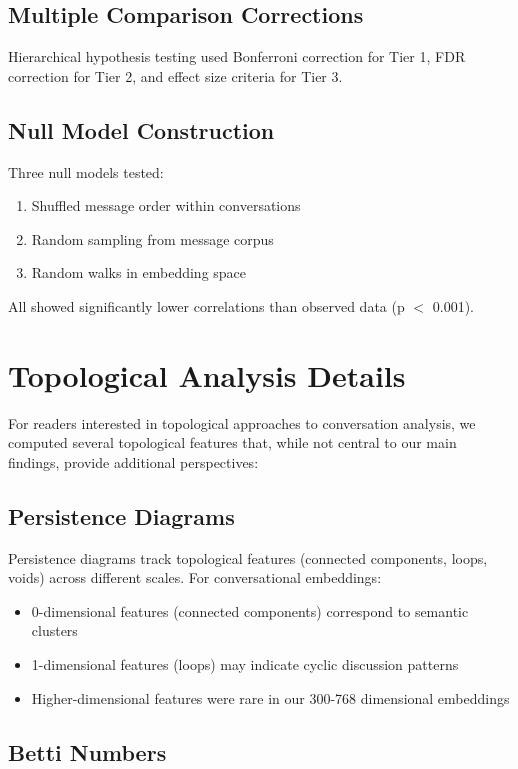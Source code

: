 \documentclass[11pt,letterpaper]{article}
\newcommand{\nullModelPValue}{0.001}
\begin{document}
\subsection{Multiple Comparison Corrections}

Hierarchical hypothesis testing used Bonferroni correction for Tier 1, FDR correction for Tier 2, and effect size criteria for Tier 3.

\subsection{Null Model Construction}

Three null models tested:
\begin{enumerate}
\item Shuffled message order within conversations
\item Random sampling from message corpus
\item Random walks in embedding space
\end{enumerate}

All showed significantly lower correlations than observed data (p $<$ \nullModelPValue{}).

\section{Topological Analysis Details}

For readers interested in topological approaches to conversation analysis, we computed several topological features that, while not central to our main findings, provide additional perspectives:

\subsection{Persistence Diagrams}

Persistence diagrams track topological features (connected components, loops, voids) across different scales. For conversational embeddings:
\begin{itemize}
\item 0-dimensional features (connected components) correspond to semantic clusters
\item 1-dimensional features (loops) may indicate cyclic discussion patterns
\item Higher-dimensional features were rare in our 300-768 dimensional embeddings
\end{itemize}

\subsection{Betti Numbers}
\end{document}
